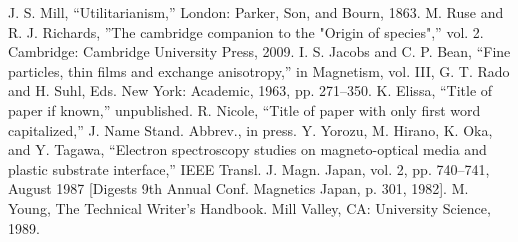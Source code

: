 \documentclass[conference]{IEEEtran}
\begin{document}
\begin{thebibliography}{00}
 J. S. Mill, ``Utilitarianism,'' London: Parker, Son, and Bourn, 1863.
 M. Ruse and R. J. Richards, ''The cambridge companion to the "Origin of species",'' vol. 2. Cambridge: Cambridge University Press, 2009.
 I. S. Jacobs and C. P. Bean, ``Fine particles, thin films and exchange anisotropy,'' in Magnetism, vol. III, G. T. Rado and H. Suhl, Eds. New York: Academic, 1963, pp. 271--350.
 K. Elissa, ``Title of paper if known,'' unpublished.
 R. Nicole, ``Title of paper with only first word capitalized,'' J. Name Stand. Abbrev., in press.
 Y. Yorozu, M. Hirano, K. Oka, and Y. Tagawa, ``Electron spectroscopy studies on magneto-optical media and plastic substrate interface,'' IEEE Transl. J. Magn. Japan, vol. 2, pp. 740--741, August 1987 [Digests 9th Annual Conf. Magnetics Japan, p. 301, 1982].
 M. Young, The Technical Writer's Handbook. Mill Valley, CA: University Science, 1989.
\end{thebibliography}
\end{document}
